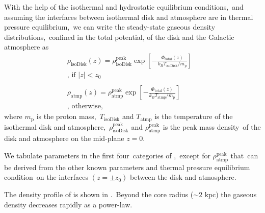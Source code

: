 \documentclass[twocolumn]{aastex631}
\begin{document}
  With the help of the isothermal and hydrostatic equilibrium conditions,\
  and assuming the interfaces between isothermal disk and atmosphere are in thermal pressure equilibrium,\
  we can write the steady-state gaseous density distributions,\
  confined in the total potential, of the disk and the Galactic atmosphere as\
  \begin{subequations}
  \begin{align}
     \displaystyle \rho_{\text{isoDisk}}(z) = \rho_{\text{isoDisk}}^{\text{peak}}
     \exp\left[-\frac{\Phi_{\text{total}}(z)}{k_{B}T_{\text{isoDisk}}/m_{\text{p}}}\right]&\label{isothermal-disk-density}\\
     \text{, if $|z| < z_{0}$}& \nonumber \\
     \nonumber\\
     \displaystyle \rho_{\text{atmp}}(z) = \rho_{\text{atmp}}^{\text{peak}}
     \exp\left[-\frac{\Phi_{\text{total}}(z)}{k_{B}T_{\text{atmp}}/m_{\text{p}}}\right]&\label{isothermal-atmp-density}\\
     \text{, otherwise,}& \nonumber
  \end{align}
  \label{disk-atm-sys}
  \end{subequations}
  where $m_{\text{p}}$ is the proton mass,\
  $T_{\text{isoDisk}}$ and $T_{\text{atmp}}$ is the temperature of the isothermal disk and atmosphere,\
  $\rho_{\text{isoDisk}}^{\text{peak}}$ and $\rho_{\text{atmp}}^{\text{peak}}$ is the peak mass density\
  of the disk and atmosphere on the mid-plane $z=0$.

  We tabulate parameters in the first four\
  categories of ,\
  except for $\rho_{\text{atmp}}^{\text{peak}}$ that\
  can be derived from the other known parameters and thermal pressure equilibrium condition\
  on the interfaces $(z=\pm z_{0})$ between the disk and atmosphere.\

  The density profile of \Cref{disk-atm-sys} is shown in .\
  Beyond the core radius ($\sim 2 \text{ kpc}$) the gaseous density decreases rapidly as a power-law.

%
\end{document}
